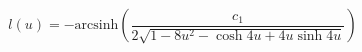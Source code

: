 \begin{equation} l(u)= -\textrm{arcsinh}\left(\frac{c_1}{2 \sqrt{1-8 u^2-\cosh{4 u}+4 u \sinh{4 u}}}\right)\end{equation}

